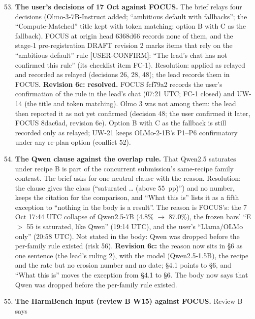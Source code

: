 \documentclass{article}
\theoremstyle{plain}
\theoremstyle{definition}
\theoremstyle{remark}
\begin{document}
\begin{enumerate}
  \setcounter{enumi}{52}
  \item \textbf{The user's decisions of 17 Oct against FOCUS.} The brief relays
        four decisions (Olmo-3-7B-Instruct added; ``ambitious default with
        fallbacks''; the ``Compute-Matched'' title kept with token matching;
        option B with C as the fallback). FOCUS at origin head 6368d66 records
        none of them, and the stage-1 pre-registration DRAFT revision 2 marks
        items that rely on the ``ambitious default'' rule [USER-CONFIRM]: ``The
        lead's chat has not confirmed this rule'' (its checklist item FC-1).
        Resolution: applied as relayed and recorded as relayed (decisions 26,
        28, 48); the lead records them in FOCUS. \textbf{Revision 6c: resolved.}
        FOCUS fcf79a2 records the user's confirmation of the rule in the lead's
        chat (07:21 UTC; FC-1 closed) and UW-14 (the title and token matching).
        Olmo 3 was not among them: the lead then reported it as not yet
        confirmed (decision 48; the user confirmed it later, FOCUS 8dac6ad,
        revision 6e). Option B with C as the fallback is still recorded only as
        relayed; UW-21 keeps OLMo-2-1B's P1--P6 confirmatory under any re-plan
        option (conflict 52).
  \item \textbf{The Qwen clause against the overlap rule.} That Qwen2.5
        saturates under recipe B is part of the concurrent submission's
        same-recipe family contrast. The brief asks for one neutral clause with
        the reason. Resolution: the clause gives the class (``saturated \ldots{}
        (above 55~pp)'') and no number, keeps the citation for the comparison,
        and ``What this is'' lists it as a fifth exception to ``nothing in the
        body is a result''. The reason is FOCUS's: the 7 Oct 17:44 UTC collapse
        of Qwen2.5-7B (4.8\% $\to$ 87.0\%), the frozen bars' ``E $>$ 55 is
        saturated, like Qwen'' (19:14 UTC), and the user's ``Llama/OLMo only''
        (20:58 UTC). Not stated in the body: Qwen was dropped before the
        per-family rule existed (risk 56). \textbf{Revision 6c:} the reason now
        sits in \S{}6 as one sentence (the lead's ruling 2), with the model
        (Qwen2.5-1.5B), the recipe and the rate but no erosion number and no
        date; \S{}4.1 points to \S{}6, and ``What this is'' moves the exception
        from \S{}4.1 to \S{}6. The body now says that Qwen was dropped before
        the per-family rule existed.
  \item \textbf{The HarmBench input (review B W15) against FOCUS.} Review B says

\end{enumerate}
\end{document}
